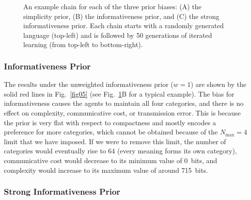 \documentclass[doc,biblatex]{apa7}
\begin{document}
	\begin{figure}
	\vspace*{2pt}
	\caption{An example chain for each of the three prior biases: (A) the simplicity prior, (B) the informativeness prior, and (C) the strong informativeness prior. Each chain starts with a randomly generated language (top-left) and is followed by 50 generations of iterated learning (from top-left to bottom-right).}
	\label{fig06}
	\end{figure}

\subsubsection{Informativeness Prior}

The results under the unweighted informativeness prior ($w=1$) are shown by the solid red lines in Fig.~\ref{fig05} (see Fig.~\ref{fig06}B for a typical example). The bias for informativeness causes the agents to maintain all four categories, and there is no effect on complexity, communicative cost, or transmission error. This is because the prior is very flat with respect to compactness and mostly encodes a preference for more categories, which cannot be obtained because of the $N_\mathrm{max}=4$ limit that we have imposed. If we were to remove this limit, the number of categories would eventually rise to 64 (every meaning forms its own category), communicative cost would decrease to its minimum value of 0~bits, and complexity would increase to its maximum value of around 715~bits.

\subsubsection{Strong Informativeness Prior}
\end{document}
